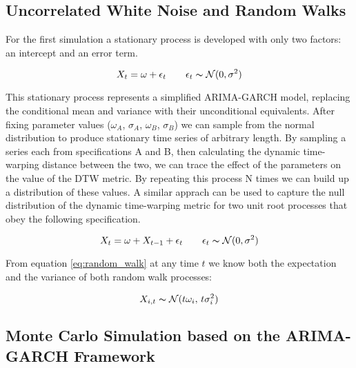 \documentclass[12pt]{article}
\begin{document}
\subsection{Uncorrelated White Noise and Random Walks} \label{sec:Uncorrelated_white_noise}

For the first simulation a stationary process is developed with only two factors: an intercept and an error term.

\begin{equation}
    X_{t} = \omega + \epsilon_{t} \qquad \epsilon_{t} \thicksim \mathcal{N}(0, \sigma^{2})
\end{equation}

This stationary process represents a simplified ARIMA-GARCH model, replacing the conditional mean and variance with their unconditional equivalents. After fixing parameter values ($\omega_{A}$, $\sigma_{A}$, $\omega_{B}$, $\sigma_{B}$) we can sample from the normal distribution to produce stationary time series of arbitrary length. By sampling a series each from specifications A and B, then calculating the dynamic time-warping distance between the two, we can trace the effect of the parameters on the value of the DTW metric. By repeating this process N times we can build up a distribution of these values. A similar apprach can be used to capture the null distribution of the dynamic time-warping metric for two unit root processes that obey the following specification.

\begin{equation} \label{eq:random_walk}
    X_{t} = \omega + X_{t-1} + \epsilon_{t} \qquad \epsilon_{t} \thicksim \mathcal{N}(0, \sigma^{2})
\end{equation}

From equation \ref{eq:random_walk} at any time $t$ we know both the expectation and the variance of both random walk processes:

\begin{equation}
    X_{i,t} \thicksim \mathcal{N}(t\omega_{i}, \, t\sigma_{i}^{2})
\end{equation}


\subsection{Monte Carlo Simulation based on the ARIMA-GARCH Framework} \label{sec:MC_sim_arma_garch}
\end{document}
